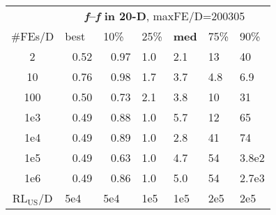 \begin{tabular}{c|llllll}
 & \multicolumn{6}{|c}{\textbf{\textit{f}\raisebox{-0.35ex}{1}--\textit{f}\raisebox{-0.35ex}{24} in 20-D}, maxFE/D=200305}\\
\#FEs/D & best & 10\% & 25\% & \textbf{med} & 75\% & 90\%\\
2 & ~\,0.52 & ~\,0.97 & \hspace*{1ex}1.0 & \hspace*{1ex}2.1 & 13 & 40\\
10 & ~\,0.76 & ~\,0.98 & \hspace*{1ex}1.7 & \hspace*{1ex}3.7 & \hspace*{1ex}4.8 & \hspace*{1ex}6.9\\
100 & ~\,0.50 & ~\,0.73 & \hspace*{1ex}2.1 & \hspace*{1ex}3.8 & 10 & 31\\
1e3 & ~\,0.49 & ~\,0.88 & \hspace*{1ex}1.0 & \hspace*{1ex}5.7 & 12 & 65\\
1e4 & ~\,0.49 & ~\,0.89 & \hspace*{1ex}1.0 & \hspace*{1ex}2.8 & 41 & 74\\
1e5 & ~\,0.49 & ~\,0.63 & \hspace*{1ex}1.0 & \hspace*{1ex}4.7 & 54 & 3.8e2\\
1e6 & ~\,0.49 & ~\,0.86 & \hspace*{1ex}1.0 & \hspace*{1ex}5.0 & 54 & 2.7e3\\
$\text{RL}_{\text{US}}$/D & 5e4 & 5e4 & 1e5 & 1e5 & 2e5 & 2e5
\end{tabular}
